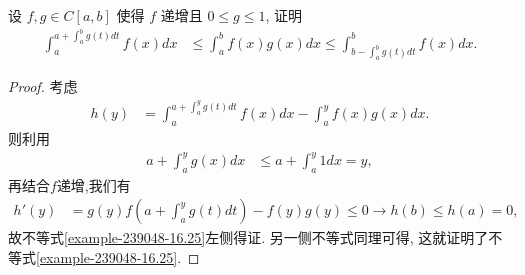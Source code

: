 \documentclass[../../main.tex]{subfiles}
\begin{document}
\begin{example}
设 $f,g \in C[a,b]$ 使得 $f$ 递增且 $0 \leqslant g \leqslant 1$, 证明
\begin{align}\label{example-239048-16.25}
\int_{a}^{a + \int_{a}^{b}g(t)dt}f(x)dx &\leqslant \int_{a}^{b}f(x)g(x)dx \leqslant \int_{b - \int_{a}^{b}g(t)dt}^{b}f(x)dx.
\end{align}
\end{example}
\begin{proof}
考虑
\begin{align*}
h(y) &= \int_{a}^{a + \int_{a}^{y}g(t)dt}f(x)dx - \int_{a}^{y}f(x)g(x)dx.
\end{align*}
则利用
\begin{align*}
a + \int_{a}^{y}g(x)dx &\leqslant a + \int_{a}^{y}1dx = y,
\end{align*}
再结合$f$递增,我们有
\begin{align*}
h'(y) &= g(y)f\left(a + \int_{a}^{y}g(t)dt\right) - f(y)g(y) \leqslant 0 \to h(b) \leqslant h(a) = 0,
\end{align*}
故不等式\eqref{example-239048-16.25}左侧得证. 另一侧不等式同理可得, 这就证明了不等式\eqref{example-239048-16.25}. 
\end{proof}
\end{document}
